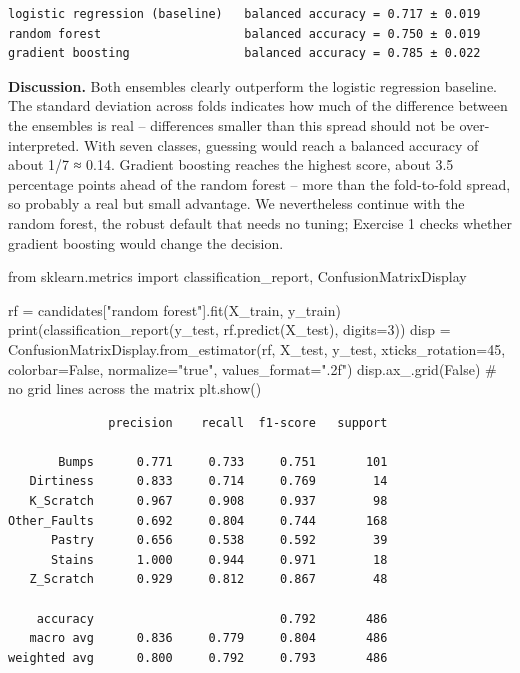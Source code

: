 \documentclass[
  letterpaper,
  DIV=11,
  numbers=noendperiod]{scrreprt}
\newenvironment{Shaded}{\begin{snugshade}}{\end{snugshade}}
\newcommand{\BuiltInTok}[1]{\textcolor[rgb]{0.00,0.23,0.31}{#1}}
\newcommand{\CommentTok}[1]{\textcolor[rgb]{0.37,0.37,0.37}{#1}}
\newcommand{\DecValTok}[1]{\textcolor[rgb]{0.68,0.00,0.00}{#1}}
\newcommand{\ImportTok}[1]{\textcolor[rgb]{0.00,0.46,0.62}{#1}}
\newcommand{\NormalTok}[1]{\textcolor[rgb]{0.00,0.23,0.31}{#1}}
\newcommand{\OperatorTok}[1]{\textcolor[rgb]{0.37,0.37,0.37}{#1}}
\newcommand{\StringTok}[1]{\textcolor[rgb]{0.13,0.47,0.30}{#1}}
\newcommand{\VariableTok}[1]{\textcolor[rgb]{0.07,0.07,0.07}{#1}}
\begin{document}
\begin{verbatim}
logistic regression (baseline)   balanced accuracy = 0.717 ± 0.019
random forest                    balanced accuracy = 0.750 ± 0.019
gradient boosting                balanced accuracy = 0.785 ± 0.022
\end{verbatim}

\textbf{Discussion.} Both ensembles clearly outperform the logistic
regression baseline. The standard deviation across folds indicates how
much of the difference between the ensembles is real -- differences
smaller than this spread should not be over-interpreted. With seven
classes, guessing would reach a balanced accuracy of about 1/7 ≈ 0.14.
Gradient boosting reaches the highest score, about 3.5 percentage points
ahead of the random forest -- more than the fold-to-fold spread, so
probably a real but small advantage. We nevertheless continue with the
random forest, the robust default that needs no tuning; Exercise 1
checks whether gradient boosting would change the decision.

\begin{Shaded}
\begin{Highlighting}[]
\ImportTok{from}\NormalTok{ sklearn.metrics }\ImportTok{import}\NormalTok{ classification\_report, ConfusionMatrixDisplay}

\NormalTok{rf }\OperatorTok{=}\NormalTok{ candidates[}\StringTok{"random forest"}\NormalTok{].fit(X\_train, y\_train)}
\BuiltInTok{print}\NormalTok{(classification\_report(y\_test, rf.predict(X\_test), digits}\OperatorTok{=}\DecValTok{3}\NormalTok{))}
\NormalTok{disp }\OperatorTok{=}\NormalTok{ ConfusionMatrixDisplay.from\_estimator(rf, X\_test, y\_test, xticks\_rotation}\OperatorTok{=}\DecValTok{45}\NormalTok{, colorbar}\OperatorTok{=}\VariableTok{False}\NormalTok{,}
\NormalTok{                                             normalize}\OperatorTok{=}\StringTok{"true"}\NormalTok{, values\_format}\OperatorTok{=}\StringTok{".2f"}\NormalTok{)}
\NormalTok{disp.ax\_.grid(}\VariableTok{False}\NormalTok{)                                   }\CommentTok{\# no grid lines across the matrix}
\NormalTok{plt.show()}
\end{Highlighting}
\end{Shaded}

\begin{verbatim}
              precision    recall  f1-score   support

       Bumps      0.771     0.733     0.751       101
   Dirtiness      0.833     0.714     0.769        14
   K_Scratch      0.967     0.908     0.937        98
Other_Faults      0.692     0.804     0.744       168
      Pastry      0.656     0.538     0.592        39
      Stains      1.000     0.944     0.971        18
   Z_Scratch      0.929     0.812     0.867        48

    accuracy                          0.792       486
   macro avg      0.836     0.779     0.804       486
weighted avg      0.800     0.792     0.793       486
\end{verbatim}
\end{document}
